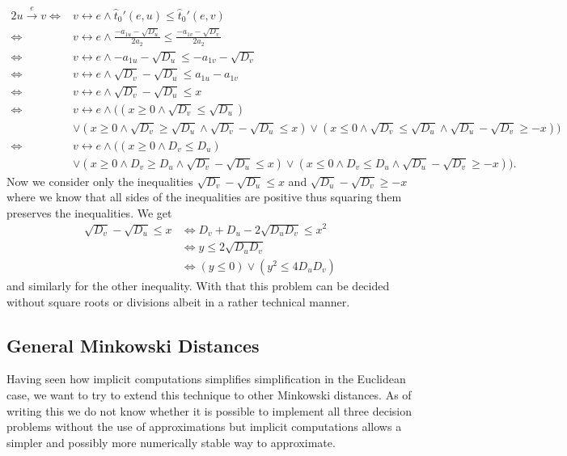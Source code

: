 \begin{alignat*}{2}
  u \overset e\rightarrow v \iff& v \leftrightarrow e \land \hat t_0'(e, u) \leq \hat t_0'(e, v) \\
  \iff& v \leftrightarrow e \land \frac{-a_{1u} - \sqrt{D_u}}{2a_2} \leq \frac{-a_{1v} - \sqrt{D_v}}{2a_2} \\
  \iff& v \leftrightarrow e \land -a_{1u} - \sqrt{D_u} \leq -a_{1v} - \sqrt{D_v} \\
  \iff& v \leftrightarrow e \land \sqrt{D_v} - \sqrt{D_u} \leq a_{1u} - a_{1v}  \\
  \iff& v \leftrightarrow e \land \sqrt{D_v} - \sqrt{D_u} \leq x  \\
  \iff& v \leftrightarrow e \land ((x \geq 0 \land \sqrt{D_v} \leq \sqrt{D_u})\\ & \lor (x \geq 0 \land \sqrt{D_v} \geq \sqrt{D_u} \land \sqrt{D_v} - \sqrt{D_u} \leq x )\lor(x \leq 0 \land \sqrt{D_v} \leq \sqrt{D_u} \land \sqrt{D_u} - \sqrt{D_v} \geq -x ) )  \\
  \iff& v \leftrightarrow e \land ((x \geq 0 \land D_v \leq D_u)\\ & \lor (x \geq 0 \land D_v \geq D_u \land \sqrt{D_v} - \sqrt{D_u} \leq x )\lor(x \leq 0 \land D_v \leq D_u \land \sqrt{D_u} - \sqrt{D_v} \geq -x ) ).
\end{alignat*}
Now we consider only the inequalities \(\sqrt{D_v} - \sqrt{D_u} \leq x\) and \(\sqrt{D_u} - \sqrt{D_v} \geq -x\) where we know that all sides of the inequalities are positive thus squaring them preserves the inequalities. We get 
\begin{align*}
  \sqrt{D_v} - \sqrt{D_u} \leq x &\iff D_v + D_u - 2\sqrt{D_uD_v} \leq x^2 \\
   &\iff y \leq 2\sqrt{D_uD_v} \\
   &\iff (y \leq 0) \lor (y^2 \leq 4D_uD_v)
\end{align*}
and similarly for the other inequality. With that this problem can be decided without square roots or divisions albeit in a rather technical manner.

\subsection{General Minkowski Distances}
Having seen how implicit computations simplifies simplification in the Euclidean case, we want to try to extend this technique to other Minkowski distances. As of writing this we do not know whether it is possible to implement all three decision problems without the use of approximations but implicit computations allows a simpler and possibly more numerically stable way to approximate. 

